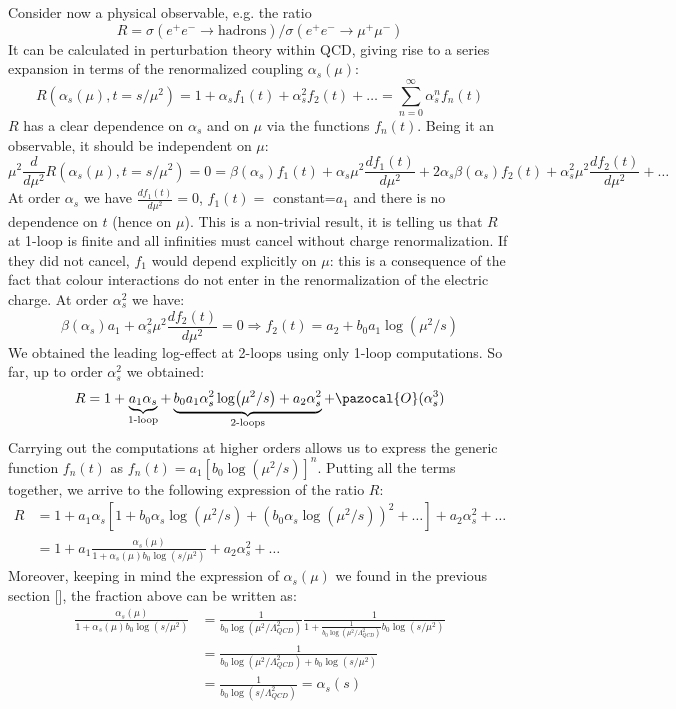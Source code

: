 \documentclass[../main.tex]{subfiles}
\begin{document}
Consider now a physical observable, e.g. the ratio 
\[
R=\sigma(e^+e^-\to\text{hadrons})/\sigma(e^+e^-\to\mu^+\mu^-)
\]
It can be calculated in perturbation theory within QCD, giving rise to a series expansion in terms of the renormalized coupling $\alpha_s(\mu)$:
\[
R(\alpha_s(\mu),t=s/\mu^2)=1+\alpha_sf_1(t)+\alpha_s^2f_2(t)+\dots=\sum_{n=0}^\infty\alpha_s^nf_n(t)
\]
$R$ has a clear dependence on $\alpha_s$ and on $\mu$ via the functions $f_n(t)$. Being it an observable, it should be independent on $\mu$:
\[
\mu^2\frac{d}{d\mu^2}R(\alpha_s(\mu),t=s/\mu^2)=0=\beta(\alpha_s)f_1(t)+\alpha_s\mu^2\frac{df_1(t)}{d\mu^2}+2\alpha_s\beta(\alpha_s)f_2(t)+\alpha_s^2\mu^2\frac{df_2(t)}{d\mu^2}+\dots
\]
At order $\alpha_s$ we have $\frac{df_1(t)}{d\mu^2}=0$, $f_1(t)=$ constant=$a_1$ and there is no dependence on $t$ (hence on $\mu$). This is a non-trivial result, it is telling us that $R$ at 1-loop is finite and all infinities must cancel without charge renormalization. If they did not cancel, $f_1$ would depend explicitly on $\mu$: this is a consequence of the fact that colour interactions do not enter in the renormalization of the electric charge. At order $\alpha_s^2$ we have:
\[
\beta(\alpha_s)a_1+\alpha_s^2\mu^2\frac{df_2(t)}{d\mu^2}=0\Rightarrow f_2(t)=a_2+b_0a_1\log(\mu^2/s)
\]
We obtained the leading log-effect at 2-loops using only 1-loop computations. So far, up to order $\alpha_s^2$ we obtained:
\[
R=1+\underbrace{a_1\alpha_s}_{\text{1-loop}}+\underbrace{b_0a_1\alpha_s^2\log(\mu^2/s)+a_2\alpha_s^2}_{\text{2-loops}}+\pazocal{O}(\alpha_s^3)
\]
Carrying out the computations at higher orders allows us to express the generic function $f_n(t)$ as $f_n(t)=a_1[b_0\log(\mu^2/s)]^n$. Putting all the terms together, we arrive to the following expression of the ratio $R$:
\begin{align*}
R&=1+a_1\alpha_s[1+b_0\alpha_s\log(\mu^2/s)+(b_0\alpha_s\log(\mu^2/s))^2+\dots]+a_2\alpha_s^2+\dots\\
&=1+a_1\frac{\alpha_s(\mu)}{1+\alpha_s(\mu)b_0\log(s/\mu^2)}+a_2\alpha_s^2+\dots
\end{align*}
Moreover, keeping in mind the expression of $\alpha_s(\mu)$ we found in the previous section [], the fraction above can be written as:
\begin{align*}
\frac{\alpha_s(\mu)}{1+\alpha_s(\mu)b_0\log(s/\mu^2)}&=\frac{1}{b_0\log(\mu^2/\Lambda_{QCD}^2)}\frac{1}{1+\frac{1}{b_0\log(\mu^2/\Lambda_{QCD}^2)}b_0\log(s/\mu^2)}\\
&=\frac{1}{b_0\log(\mu^2/\Lambda_{QCD}^2)+b_0\log(s/\mu^2)}\\
&=\frac{1}{b_0\log(s/\Lambda_{QCD}^2)}=\alpha_s(s)
\end{align*}
\end{document}
